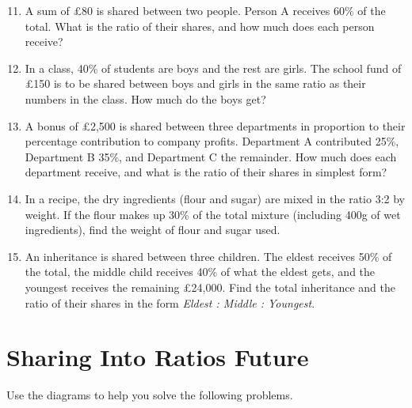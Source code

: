 \documentclass[12pt,a4paper]{article}
\begin{document}
\begin{enumerate}
    \setcounter{enumi}{10}
    \item A sum of £80 is shared between two people. Person A receives 60\% of the total. What is the ratio of their shares, and how much does each person receive?

    \item In a class, 40\% of students are boys and the rest are girls. The school fund of £150 is to be shared between boys and girls in the same ratio as their numbers in the class. How much do the boys get?
    
    \item A bonus of £2,500 is shared between three departments in proportion to their percentage contribution to company profits. Department A contributed 25\%, Department B 35\%, and Department C the remainder. How much does each department receive, and what is the ratio of their shares in simplest form?
    
    \item In a recipe, the dry ingredients (flour and sugar) are mixed in the ratio 3:2 by weight. If the flour makes up 30\% of the total mixture (including 400g of wet ingredients), find the weight of flour and sugar used.
    
    \item An inheritance is shared between three children. The eldest receives 50\% of the total, the middle child receives 40\% of what the eldest gets, and the youngest receives the remaining £24,000. Find the total inheritance and the ratio of their shares in the form \textit{Eldest : Middle : Youngest}.
\end{enumerate}



\section*{Sharing Into Ratios Future}
Use the diagrams to help you solve the following problems.
\end{document}
